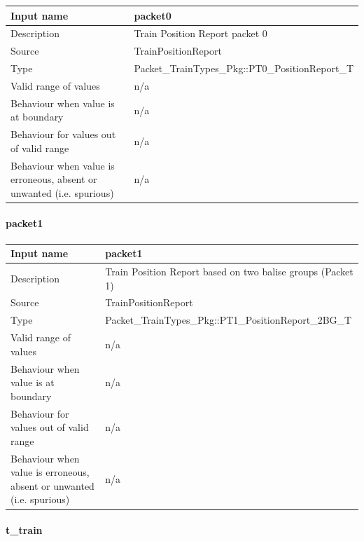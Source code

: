 \begin{longtable}{p{}p{}}
\toprule
Input name				& packet0\\
\midrule
Description				& Train Position Report packet 0  \\
\midrule
Source					& TrainPositionReport \\ 
\midrule
Type					& Packet\_TrainTypes\_Pkg::PT0\_PositionReport\_T\\
\midrule
Valid range of values	& n/a \\
\midrule
Behaviour when value is at boundary	& n/a\\
\midrule
Behaviour for values out of valid range	& n/a\\
\midrule
Behaviour when value is erroneous, absent or unwanted (i.e. spurious) & n/a\\

\bottomrule


\end{longtable}

\paragraph{packet1}

\begin{longtable}{p{}p{}}
\toprule
Input name				& packet1\\
\midrule
Description				& Train Position Report based on two balise groups (Packet 1)  \\
\midrule
Source					& TrainPositionReport \\ 
\midrule
Type					& Packet\_TrainTypes\_Pkg::PT1\_PositionReport\_2BG\_T\\
\midrule
Valid range of values	& n/a \\
\midrule
Behaviour when value is at boundary	& n/a\\
\midrule
Behaviour for values out of valid range	& n/a\\
\midrule
Behaviour when value is erroneous, absent or unwanted (i.e. spurious) & n/a\\

\bottomrule


\end{longtable}


\paragraph{t\_train}

